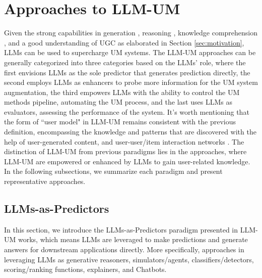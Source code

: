 \documentclass[11pt]{article}
\newcommand{\edit}[1]{\textcolor{blue}{#1}}
\newcommand{\comments}[1]{\textcolor{red}{[Re:~#1]}}
\begin{document}


\section{Approaches to LLM-UM}

\label{sec:approach}
Given the strong capabilities in generation \cite{zhao2023survey}, reasoning \cite{wei2022chain}, knowledge comprehension \cite{sun2023head}, and a good understanding of UGC as elaborated in Section \ref{sec:motivation}, LLMs can be used to supercharge UM systems. The LLM-UM approaches can be generally categorized into three categories based on the LLMs' role, 
where the first envisions LLMs as the sole predictor that generates prediction directly, 
the second employs LLMs as enhancers to probe more information for the UM system augmentation, 
the third empowers LLMs with the ability to control the UM methods pipeline, automating the UM process, and the last uses LLMs as evaluators, assessing the performance of the system.
It's worth mentioning that the form of ``user model" in LLM-UM remains consistent with the previous definition, encompassing the knowledge and patterns that are discovered with the help of user-generated content, and user-user/item interaction networks \cite{he2023survey}. The distinction of LLM-UM from previous paradigms lies in the approaches, where LLM-UM are empowered or enhanced by LLMs to gain user-related knowledge.
In the following subsections, we summarize each paradigm and present representative approaches.



\subsection{LLMs-as-Predictors}
\label{sec:approach_predictor}
In this section, we introduce the LLMs-as-Predictors paradigm presented in LLM-UM works, which means LLMs are leveraged to make predictions and generate answers for downstream applications directly. More specifically, approaches in leveraging LLMs as generative reasoners, simulators/agents, classifiers/detectors, scoring/ranking functions, explainers, and Chatbots.
\end{document}
